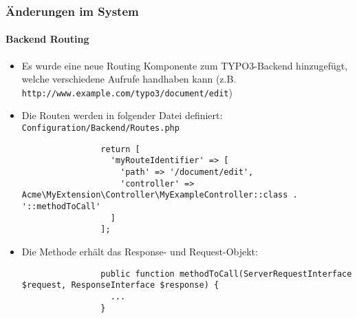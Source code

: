 \begin{frame}[fragile]
	\frametitle{Änderungen im System}
	\framesubtitle{Backend Routing}

	\lstset{basicstyle=\tiny\ttfamily}

	\begin{itemize}

		\item Es wurde eine neue Routing Komponente zum TYPO3-Backend hinzugefügt,
			welche verschiedene Aufrufe handhaben kann\newline
			\small
				(z.B. \texttt{http://www.example.com/typo3/document/edit})
			\normalsize

		\item Die Routen werden in folgender Datei definiert:\newline
			\small
				\texttt{Configuration/Backend/Routes.php}
			\normalsize

			\begin{lstlisting}
				return [
				  'myRouteIdentifier' => [
				    'path' => '/document/edit',
				    'controller' => Acme\MyExtension\Controller\MyExampleController::class . '::methodToCall'
				  ]
				];
			\end{lstlisting}

		\item Die Methode erhält das Response- und Request-Objekt:

			\begin{lstlisting}
				public function methodToCall(ServerRequestInterface $request, ResponseInterface $response) {
				  ...
				}
			\end{lstlisting}

	\end{itemize}

\end{frame}

